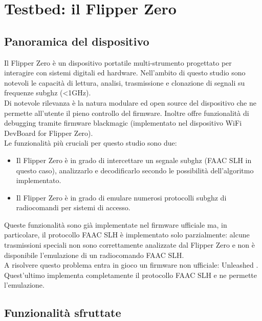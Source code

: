 \chapter{Testbed: il Flipper Zero}
\label{cha:testbed}

\section{Panoramica del dispositivo}
\label{sec:device}

Il Flipper Zero è un dispositivo portatile multi-strumento progettato per interagire con sistemi digitali ed hardware. Nell'ambito di questo studio sono notevoli le capacità di lettura, analisi, trasmissione e clonazione di segnali su frequenze subghz (\textless1GHz).\\
Di notevole rilevanza è la natura modulare ed open source del dispositivo che ne permette all'utente il pieno controllo del firmware. Inoltre offre funzionalità di debugging tramite firmware blackmagic (implementato nel dispositivo WiFi DevBoard for Flipper Zero).\\
Le funzionalità più cruciali per questo studio sono due:
\begin{itemize}
  \item Il Flipper Zero è in grado di intercettare un segnale subghz (FAAC SLH in questo caso), analizzarlo e decodificarlo secondo le possibilità dell'algoritmo implementato.
  \item Il Flipper Zero è in grado di emulare numerosi protocolli subghz di radiocomandi per sistemi di accesso.
\end{itemize}
Queste funzionalità sono già implementate nel firmware ufficiale \cite{off_firmware} ma, in particolare, il protocollo FAAC SLH è implementato solo parzialmente: alcune trasmissioni speciali non sono correttamente analizzate dal Flipper Zero e non è disponibile l'emulazione di un radiocomando FAAC SLH.\\
A risolvere questo problema entra in gioco un firmware non ufficiale: Unleashed \cite{firmware}. Quest'ultimo implementa completamente il protocollo FAAC SLH e ne permette l'emulazione.\\

\section{Funzionalità sfruttate}
\label{sec:flip_func}

